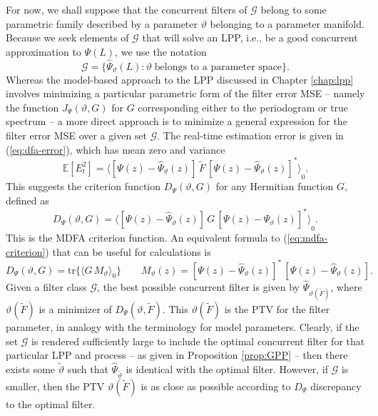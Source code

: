 \documentclass[a4paper]{book}
\def\EE{\mathbb E}
\begin{document}
  For now, we shall suppose that the concurrent filters of $\mathcal{G}$ belong
 to some parametric family described by a parameter $\vartheta$ belonging to a 
 parameter manifold.  Because we seek elements of $\mathcal{G}$ that will solve
 an LPP, i.e., be a good concurrent approximation to $\Psi (L)$, we use the notation
\begin{equation}
 \label{eq:filter-set}
 \mathcal{G} = \{
 \widehat{\Psi}_{\vartheta}  (L) : \vartheta \; \mbox{belongs to a
  parameter space} \}.
\end{equation}
  Whereas the model-based 
 approach to the LPP  discussed in Chapter \ref{chap:lpp} 
involves minimizing a particular parametric form of the filter error MSE -- namely
 the function $J_{\Psi} (\vartheta, G)$ for $G$ corresponding either to the
 periodogram or true spectrum -- a more direct approach is
 to  minimize a general expression for the filter error MSE over a given set
 $\mathcal{G}$.    The real-time estimation error is given in 
(\ref{eq:dfa-error}),  which has mean zero and variance
\begin{equation}
 \label{eq:dfa-mvar}
 \EE [ E_t^2 ]  = { \langle  \left[ \Psi (z) -  \widehat{\Psi}_{\vartheta} (z) \right] \, 
  \widetilde{F} \,
  {  \left[ \Psi (z) -  \widehat{\Psi}_{\vartheta} (z) \right] }^{*} \rangle }_0.
\end{equation}
  This suggests the criterion function  $D_{\Psi} (\vartheta, G)$ for
 any Hermitian function $G$, defined as
\begin{equation}
\label{eq:mdfa-criterion}
 D_{\Psi} (\vartheta, G) = { \langle  \left[ \Psi (z) - 
 \widehat{\Psi}_{\vartheta} (z) \right] \,   G \,
  {  \left[ \Psi (z) -  \widehat{\Psi}_{\vartheta} (z) \right] }^{*} \rangle }_0.
\end{equation}
 This is the MDFA criterion function.  
 An equivalent formula to (\ref{eq:mdfa-criterion}) that can be useful for calculations is
\begin{equation}
 \label{eq:mdfa-alternate}
   D_{\Psi} (\vartheta, G) = \mbox{tr} \{ 
 { \langle G \, M_{\vartheta} \rangle }_0 \} \qquad M_{\vartheta} (z) = 
 {  \left[ \Psi (z) -  \widehat{\Psi}_{\vartheta} (z) \right] }^{*} \,
   {  \left[ \Psi (z) -  \widehat{\Psi}_{\vartheta} (z) \right] }.
\end{equation}
 Given a filter class $\mathcal{G}$, the
 best possible concurrent filter is  given by
 $\widehat{\Psi}_{\vartheta (\widetilde{F})}$,
  where $\vartheta (\widetilde{F})$ is a minimizer of
  $D_{\Psi} (\vartheta, \widetilde{F})$.  This
 $\vartheta (\widetilde{F})$ is the
 PTV for the filter parameter, in analogy with the
 terminology for model parameters.  Clearly, if the set $\mathcal{G}$ is rendered
 sufficiently large to include the optimal concurrent filter for that particular
 LPP and process -- as given in Proposition \ref{prop:GPP} -- then there exists
 some $\widetilde{\vartheta}$ such that $\widehat{\Psi}_{\widetilde{\vartheta}}$ 
 is identical with the optimal filter.  However, if $\mathcal{G}$ is smaller,
 then the PTV $\vartheta (\widetilde{F})$ is as close as possible according
 to $D_{\Psi} $ discrepancy to the optimal filter.  
\end{document}
